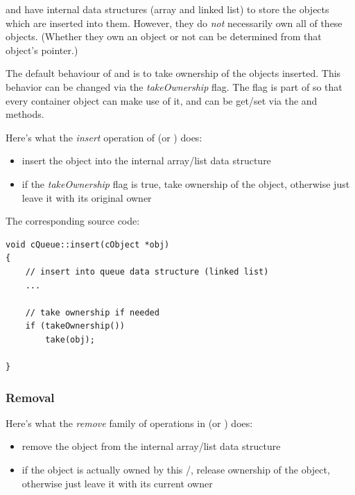  and  have internal data structures
(array and linked list) to store the objects which are inserted
into them. However, they do \textit{not} necessarily own all of these
objects.  (Whether they own an object or not can be determined
from that object's  pointer.)

The default behaviour of  and  is
to take ownership of the objects inserted.
This behavior can be changed via the \textit{takeOwnership} flag.
The flag is part of  so that every container object
can make use of it, and can be get/set via the
 and  methods.

Here's what the \textit{insert} operation of  (or ) does:
\begin{itemize}
    \item{insert the object into the internal array/list data structure}

    \item{if the \textit{takeOwnership} flag is true, take ownership
    of the object, otherwise just leave it with its original owner}
\end{itemize}

The corresponding source code:

\begin{verbatim}
void cQueue::insert(cObject *obj)
{
    // insert into queue data structure (linked list)
    ...

    // take ownership if needed
    if (takeOwnership())
        take(obj);

}
\end{verbatim}


\subsubsection{Removal}

Here's what the \textit{remove} family of operations in 
(or ) does:

\begin{itemize}
    \item{remove the object from the internal array/list data structure}

    \item{if the object is actually owned by this /,
    release ownership of the object, otherwise just leave it with
    its current owner}
\end{itemize}

